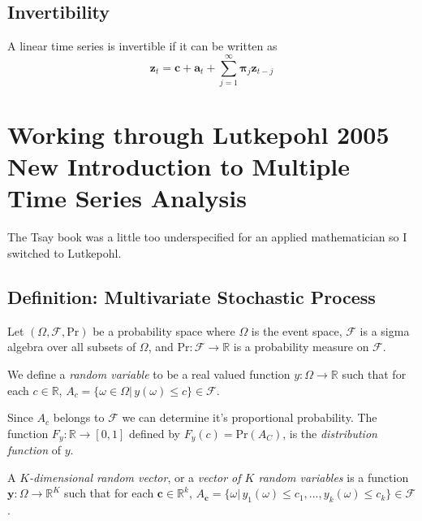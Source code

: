 \documentclass{article}
\begin{document}
        \subsection{Invertibility}
            A linear time series is invertible if it can be 
            written as
            \begin{equation}
                \mathbf{z}_t = \mathbf{c} + \mathbf{a}_t 
                + \sum_{j=1}^\infty \mathbf{\pi}_j \mathbf{z}_{t-j}
            \end{equation}

    \section{Working through Lutkepohl 2005 New Introduction to Multiple
    Time Series Analysis}

        The Tsay book was a little too underspecified for an applied 
        mathematician so I switched to Lutkepohl.

        \subsection{Definition: Multivariate Stochastic Process}

            Let $(\Omega, \mathcal{F}, \text{Pr})$ be a probability space where 
            $\Omega$ is the event space, 
            $\mathcal{F}$ is a sigma algebra over all subsets of $\Omega$,
            and $\text{Pr}: \mathcal{F} \rightarrow \mathbb{R}$ is a probability 
            measure on $\mathcal{F}$.

            We define a \textit{random variable} to be a real valued
            function $y: \Omega \rightarrow \mathbb{R}$ such that for each 
            $c \in \mathbb{R}$, 
            $A_c = \{\omega \in \Omega | \, y(\omega) \leq c\} \in \mathcal{F}$.
            
            Since $A_c$ belongs to $\mathcal{F}$ we can determine it's proportional
            probability. The
            function $F_y: \mathbb{R} \rightarrow [0,1]$ defined by 
            $F_y(c) = \text{Pr}(A_C)$, is the \textit{distribution function} of $y$.

            A \textit{$K$-dimensional random vector}, or a 
            \textit{vector of $K$ random variables}
            is a function $\mathbf{y}: \Omega \rightarrow \mathbb{R}^K$ such that
            for each $\mathbf{c} \in \mathbb{R}^k$, 
            $A_\mathbf{c} = \{\omega | \, y_1(\omega) \leq c_1, ... , y_k(\omega) 
            \leq c_k\} \in \mathcal{F}$. 
\end{document}
